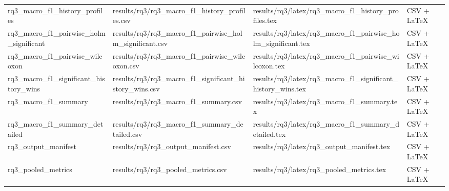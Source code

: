 \begin{table}[tbp]
\begin{tabular}{llll}
rq3\_macro\_f1\_history\_profiles & results/rq3/rq3\_macro\_f1\_history\_profiles.csv & results/rq3/latex/rq3\_macro\_f1\_history\_profiles.tex & CSV + LaTeX \\
rq3\_macro\_f1\_pairwise\_holm\_significant & results/rq3/rq3\_macro\_f1\_pairwise\_holm\_significant.csv & results/rq3/latex/rq3\_macro\_f1\_pairwise\_holm\_significant.tex & CSV + LaTeX \\
rq3\_macro\_f1\_pairwise\_wilcoxon & results/rq3/rq3\_macro\_f1\_pairwise\_wilcoxon.csv & results/rq3/latex/rq3\_macro\_f1\_pairwise\_wilcoxon.tex & CSV + LaTeX \\
rq3\_macro\_f1\_significant\_history\_wins & results/rq3/rq3\_macro\_f1\_significant\_history\_wins.csv & results/rq3/latex/rq3\_macro\_f1\_significant\_history\_wins.tex & CSV + LaTeX \\
rq3\_macro\_f1\_summary & results/rq3/rq3\_macro\_f1\_summary.csv & results/rq3/latex/rq3\_macro\_f1\_summary.tex & CSV + LaTeX \\
rq3\_macro\_f1\_summary\_detailed & results/rq3/rq3\_macro\_f1\_summary\_detailed.csv & results/rq3/latex/rq3\_macro\_f1\_summary\_detailed.tex & CSV + LaTeX \\
rq3\_output\_manifest & results/rq3/rq3\_output\_manifest.csv & results/rq3/latex/rq3\_output\_manifest.tex & CSV + LaTeX \\
rq3\_pooled\_metrics & results/rq3/rq3\_pooled\_metrics.csv & results/rq3/latex/rq3\_pooled\_metrics.tex & CSV + LaTeX \\
\bottomrule
\end{tabular}
\end{table}
